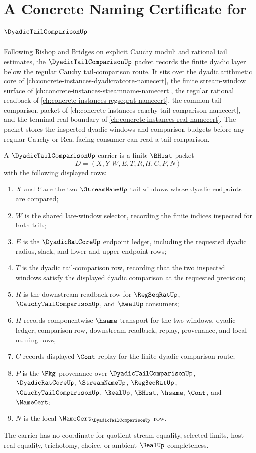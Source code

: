 \chapter{A Concrete Naming Certificate for $\DyadicTailComparisonUp$}
\label{ch:concrete-instances-dyadic-tail-comparison-namecert}

Following Bishop and Bridges on explicit Cauchy moduli and rational tail estimates, the $\DyadicTailComparisonUp$ packet records the finite dyadic layer below the regular Cauchy tail-comparison route. It sits over the dyadic arithmetic core of \autoref{ch:concrete-instances-dyadicratcore-namecert}, the finite stream-window surface of \autoref{ch:concrete-instances-streamname-namecert}, the regular rational readback of \autoref{ch:concrete-instances-regseqrat-namecert}, the common-tail comparison packet of \autoref{ch:concrete-instances-cauchy-tail-comparison-namecert}, and the terminal real boundary of \autoref{ch:concrete-instances-real-namecert}. The packet stores the inspected dyadic windows and comparison budgets before any regular Cauchy or Real-facing consumer can read a tail comparison.

\begin{definition}
\label{def:dyadic-tail-comparison-carrier}
A $\DyadicTailComparisonUp$ carrier is a finite $\BHist$ packet
$$
D=(X,Y,W,E,T,R,H,C,P,N)
$$
with the following displayed rows:
\begin{enumerate}
\item $X$ and $Y$ are the two $\StreamNameUp$ tail windows whose dyadic endpoints are compared;
\item $W$ is the shared late-window selector, recording the finite indices inspected for both tails;
\item $E$ is the $\DyadicRatCoreUp$ endpoint ledger, including the requested dyadic radius, slack, and lower and upper endpoint rows;
\item $T$ is the dyadic tail-comparison row, recording that the two inspected windows satisfy the displayed dyadic comparison at the requested precision;
\item $R$ is the downstream readback row for $\RegSeqRatUp$, $\CauchyTailComparisonUp$, and $\RealUp$ consumers;
\item $H$ records componentwise $\hsame$ transport for the two windows, dyadic ledger, comparison row, downstream readback, replay, provenance, and local naming rows;
\item $C$ records displayed $\Cont$ replay for the finite dyadic comparison route;
\item $P$ is the $\Pkg$ provenance over $\DyadicTailComparisonUp$, $\DyadicRatCoreUp$, $\StreamNameUp$, $\RegSeqRatUp$, $\CauchyTailComparisonUp$, $\RealUp$, $\BHist$, $\hsame$, $\Cont$, and $\NameCert$;
\item $N$ is the local $\NameCert_{\DyadicTailComparisonUp}$ row.
\end{enumerate}
The carrier has no coordinate for quotient stream equality, selected limits, host real equality, trichotomy, choice, or ambient $\RealUp$ completeness.
\end{definition}

